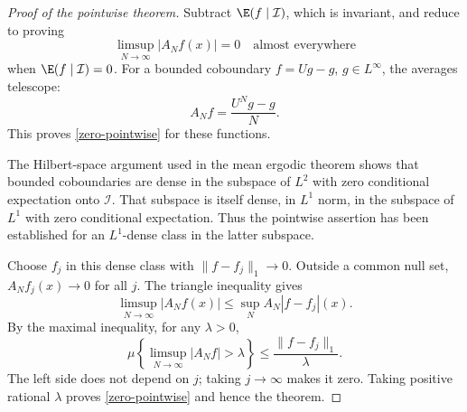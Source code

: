 \begin{proof}[Proof of the pointwise theorem]
Subtract $\E(f\mid\mathcal I)$, which is invariant, and reduce to proving
\begin{equation}\label{zero-pointwise}
 \limsup_{N\to\infty}|A_Nf(x)|=0\quad\text{almost everywhere}
\end{equation}
when $\E(f\mid\mathcal I)=0$. For a bounded coboundary $f=Ug-g$,
$g\in L^\infty$, the averages telescope:
\[
 A_Nf=\frac{U^Ng-g}{N}.
\]
This proves \eqref{zero-pointwise} for these functions.

The Hilbert-space argument used in the mean ergodic theorem shows that
bounded coboundaries are dense in the subspace of $L^2$ with zero
conditional expectation onto $\mathcal I$. That subspace is itself dense,
in $L^1$ norm, in the subspace of $L^1$ with zero conditional expectation.
Thus the pointwise assertion has been established for an $L^1$-dense class
in the latter subspace.

Choose $f_j$ in this dense class with $\|f-f_j\|_1\to0$. Outside a common
null set, $A_Nf_j(x)\to0$ for all $j$. The triangle inequality gives
\[
 \limsup_{N\to\infty}|A_Nf(x)|
 \leq\sup_N A_N|f-f_j|(x).
\]
By the maximal inequality, for any $\lambda>0$,
\[
 \mu\left\{\limsup_{N\to\infty}|A_Nf|>\lambda\right\}
 \leq\frac{\|f-f_j\|_1}{\lambda}.
\]
The left side does not depend on $j$; taking $j\to\infty$ makes it zero.
Taking positive rational $\lambda$ proves \eqref{zero-pointwise} and hence
the theorem.
\end{proof}
